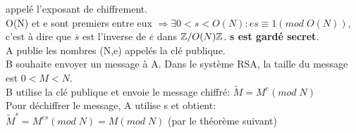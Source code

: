 appelé l'exposant de chiffrement.\\

O(N) et e sont premiers entre eux $\Rightarrow \exists 0 < s < O(N): es \equiv 1(mod\;O(N))$, c'est à dire que $\overline{s}$ est l'inverse de $\overline{e}$ dans $\mathbb{Z}/O(N)\mathbb{Z}$. \textbf{s est gardé secret}. \\

A publie les nombres (N,e) appelés la clé publique.\\

B souhaite envoyer un message à A. Dans le système RSA, la taille du message est $0<M<N$.\\

B utilise la clé publique et envoie le message chiffré: $\tilde{M} = M^e (mod\;N)$\\

Pour déchiffrer le message, A utilise s et obtient: $\tilde{M}^s = M^{es}(mod\;N) = M(mod\;N)$ (par le théorème suivant)\\